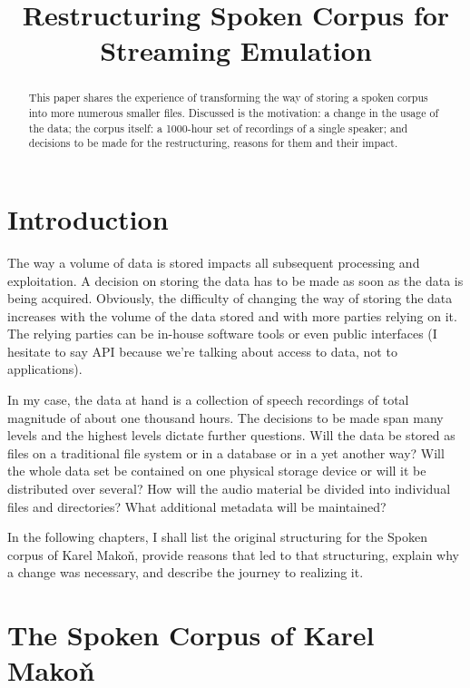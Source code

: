 \documentclass[conference]{IEEEtran}
\title{Restructuring Spoken Corpus for Streaming Emulation}
\author{
\IEEEauthorblockN{Jan Oldřich Krůza}
\IEEEauthorblockA{
Institute of Formal and Applied Linguistics,\\
Faculty of Mathematics and Physics,\\
Charles University\\
Email: kruza@ufal.mff.cuni.cz}
}
\begin{document}
\maketitle              %

\begin{abstract}
This paper shares the experience of transforming the way of storing a spoken
corpus into more numerous smaller files. Discussed is the motivation: a change
in the usage of the data; the corpus itself: a 1000-hour set of recordings of a
single speaker; and decisions to be made for the restructuring, reasons for them
and their impact.
\end{abstract}

\section{Introduction}

The way a volume of data is stored impacts all subsequent processing and
exploitation\cite{reppen2010building}. A decision on storing the data has to be made as soon as the
data is being acquired. Obviously, the difficulty of changing the way of storing
the data increases with the volume of the data stored and with more parties relying
on it. The relying parties can be in-house software tools or even public
interfaces (I hesitate to say API because we're talking about access to data,
not to applications).

In my case, the data at hand is a collection of speech recordings of total
magnitude of about one thousand hours. The decisions to be made span many levels
and the highest levels dictate further questions. Will the data be stored as
files on a traditional file system or in a database or in a yet another way?
Will the whole data set be contained on one physical storage device or will it
be distributed over several? How will the audio material be divided into
individual files and directories? What additional metadata will be
maintained?\cite{crowdy1993spoken}

In the following chapters, I shall list the original structuring for the Spoken
corpus of Karel Makoň, provide reasons that led to that structuring, explain why
a change was necessary, and describe the journey to realizing it.

\section{The Spoken Corpus of Karel Makoň}
\end{document}
